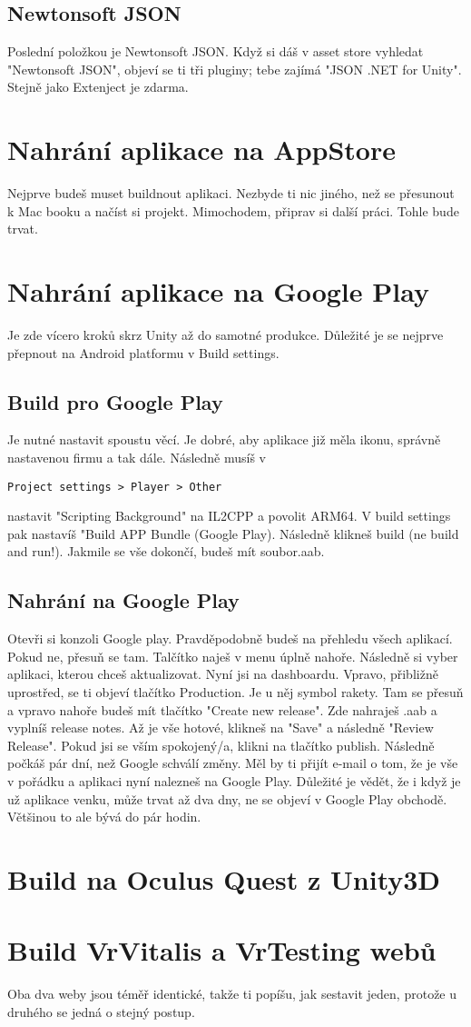 \documentclass{article}
\begin{document}
\subsection{Newtonsoft JSON}
Poslední položkou je Newtonsoft JSON. Když si dáš v asset store vyhledat "Newtonsoft JSON", objeví se ti tři pluginy; tebe zajímá "JSON .NET for Unity". Stejně jako Extenject je zdarma.

\pagebreak

\section{Nahrání aplikace na AppStore}
Nejprve budeš muset buildnout aplikaci. Nezbyde ti nic jiného, než se přesunout k Mac booku a načíst si projekt. Mimochodem, připrav si další práci. Tohle bude trvat.
\pagebreak

\section{Nahrání aplikace na Google Play}
Je zde vícero kroků skrz Unity až do samotné produkce. Důležité je se nejprve přepnout na Android platformu v Build settings.
\subsection{Build pro Google Play}
Je nutné nastavit spoustu věcí. Je dobré, aby aplikace již měla ikonu, správně nastavenou firmu a tak dále.
Následně musíš v 
\begin{lstlisting}
Project settings > Player > Other
\end{lstlisting}
nastavit "Scripting Background" na IL2CPP a povolit ARM64.
V build settings pak nastavíš "Build APP Bundle (Google Play).
Následně klikneš build (ne build and run!). Jakmile se vše dokončí, budeš mít soubor.aab.
\subsection{Nahrání na Google Play}
Otevři si konzoli Google play. Pravděpodobně budeš na přehledu všech aplikací. Pokud ne, přesuň se tam. Talčítko naješ v menu úplně nahoře. Následně si vyber aplikaci, kterou chceš aktualizovat.
Nyní jsi na dashboardu. Vpravo, přibližně uprostřed, se ti objeví tlačítko Production. Je u něj symbol rakety. Tam se přesuň a vpravo nahoře budeš mít tlačítko "Create new release". Zde nahraješ .aab a vyplníš release notes.
Až je vše hotové, klikneš na "Save" a následně "Review Release". Pokud jsi se vším spokojený/a, klikni na tlačítko publish. Následně počkáš pár dní, než Google schválí změny. Měl by ti přijít e-mail o tom, že je vše v pořádku a aplikaci nyní nalezneš na Google Play. Důležité je vědět, že i když je už aplikace venku, může trvat až dva dny, ne se objeví v Google Play obchodě. Většinou to ale bývá do pár hodin.

\pagebreak

\section{Build na Oculus Quest z Unity3D}
\pagebreak

\section{Build VrVitalis a VrTesting webů}
Oba dva weby jsou téměř identické, takže ti popíšu, jak sestavit jeden, protože u druhého se jedná o stejný postup.
\pagebreak
\end{document}
